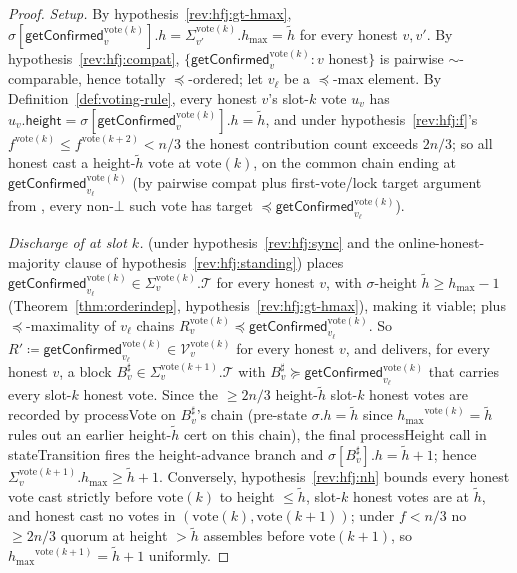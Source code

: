 \documentclass{article}
\newcommand{\T}[0]{\ensuremath{\mathcal{T}}}
\newcommand{\V}[0]{\ensuremath{\mathcal{V}}}
\newcommand{\height}{\mathsf{height}}
\newcommand{\hmax}{\ensuremath{h_{\max}}\xspace}
\newcommand{\stateTransition}{\textsf{stateTransition}\xspace}
\newcommand{\processHeight}{\textsf{processHeight}\xspace}
\newcommand{\processVote}{\textsf{processVote}\xspace}
\newcommand{\vote}{\ensuremath{\mathrm{vote}}}
\newcommand{\comm}[1]{\ensuremath{\widetilde{#1}}}
\newcommand{\getConfirmed}{\textsf{getConfirmed}\xspace}
\theoremstyle{plain}
\theoremstyle{definition}
\theoremstyle{remark}
\begin{document}
\begin{proof}
\emph{Setup.}
By hypothesis~\ref{rev:hfj:gt-hmax}, $\sigma[\getConfirmed_v^{\vote(k)}].h = \Sigma_{v'}^{\vote(k)}.\hmax = \comm{h}$ for every honest $v, v'$.
By hypothesis~\ref{rev:hfj:compat}, $\{\getConfirmed_v^{\vote(k)} : v \text{ honest}\}$ is pairwise $\sim$-comparable, hence totally $\preceq$-ordered; let $v_\ell$ be a $\preceq$-max element.
By Definition~\ref{def:voting-rule}, every honest $v$'s slot-$k$ vote $u_v$ has $u_v.\height = \sigma[\getConfirmed_v^{\vote(k)}].h = \comm{h}$, and under hypothesis~\ref{rev:hfj:f}'s $f^{\vote(k)} \leq f^{\vote(k+2)} < n/3$ the honest contribution count exceeds $2n/3$;
so all honest cast a height-$\comm{h}$ vote at $\vote(k)$, on the common chain ending at $\getConfirmed_{v_\ell}^{\vote(k)}$ (by pairwise compat plus first-vote/lock target argument from , every non-$\bot$ such vote has target $\preceq \getConfirmed_{v_\ell}^{\vote(k)}$).

\emph{Discharge of  at slot $k$.}
 (under hypothesis~\ref{rev:hfj:sync} and the online-honest-majority clause of hypothesis~\ref{rev:hfj:standing}) places $\getConfirmed_{v_\ell}^{\vote(k)} \in \Sigma_v^{\vote(k)}.\T$ for every honest $v$, with $\sigma$-height $\comm{h} \geq \hmax - 1$ (Theorem~\ref{thm:orderindep}, hypothesis~\ref{rev:hfj:gt-hmax}), making it viable;
 plus $\preceq$-maximality of $v_\ell$ chains $R_v^{\vote(k)} \preceq \getConfirmed_{v_\ell}^{\vote(k)}$.
So $R' \coloneqq \getConfirmed_{v_\ell}^{\vote(k)} \in \V_v^{\vote(k)}$ for every honest $v$, and  delivers, for every honest $v$, a block $B^\sharp_v \in \Sigma_v^{\vote(k+1)}.\T$ with $B^\sharp_v \succeq \getConfirmed_{v_\ell}^{\vote(k)}$ that carries every slot-$k$ honest vote.
Since the $\geq 2n/3$ height-$\comm{h}$ slot-$k$ honest votes are recorded by \processVote{} on $B^\sharp_v$'s chain (pre-state $\sigma.h = \comm{h}$ since $\hmax^{\vote(k)} = \comm{h}$ rules out an earlier height-$\comm{h}$ cert on this chain), the final \processHeight{} call in \stateTransition{} fires the height-advance branch and $\sigma[B^\sharp_v].h = \comm{h}+1$;
hence $\Sigma_v^{\vote(k+1)}.\hmax \geq \comm{h}+1$.
Conversely, hypothesis~\ref{rev:hfj:nh} bounds every honest vote cast strictly before $\vote(k)$ to height $\leq \comm{h}$, slot-$k$ honest votes are at $\comm{h}$, and honest cast no votes in $(\vote(k), \vote(k+1))$;
under $f<n/3$ no $\geq 2n/3$ quorum at height $> \comm{h}$ assembles before $\vote(k+1)$, so $\hmax^{\vote(k+1)} = \comm{h}+1$ uniformly.


\end{proof}
\end{document}

